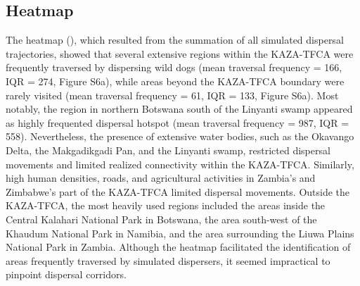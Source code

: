 \documentclass[abstract=on,10pt,a4paper,bibliography=totocnumbered]{article}
\begin{document}
\subsection{Heatmap}
The heatmap (), which resulted from the summation of all simulated
dispersal trajectories, showed that several extensive regions within the
KAZA-TFCA were frequently traversed by dispersing wild dogs (mean traversal
frequency = 166, IQR = 274, Figure S6a), while areas beyond the KAZA-TFCA
boundary were rarely visited (mean traversal frequency = 61, IQR = 133, Figure
S6a). Most notably, the region in northern Botswana south of the Linyanti swamp
appeared as highly frequented dispersal hotspot (mean traversal frequency = 987,
IQR = 558). Nevertheless, the presence of extensive water bodies, such as the
Okavango Delta, the Makgadikgadi Pan, and the Linyanti swamp, restricted
dispersal movements and limited realized connectivity within the KAZA-TFCA.
Similarly, high human densities, roads, and agricultural activities in Zambia's
and Zimbabwe's part of the KAZA-TFCA limited dispersal movements. Outside the
KAZA-TFCA, the most heavily used regions included the areas inside the Central
Kalahari National Park in Botswana, the area south-west of the Khaudum National
Park in Namibia, and the area surrounding the Liuwa Plains National Park in
Zambia. Although the heatmap facilitated the identification of areas frequently
traversed by simulated dispersers, it seemed impractical to pinpoint dispersal
corridors.
\end{document}
